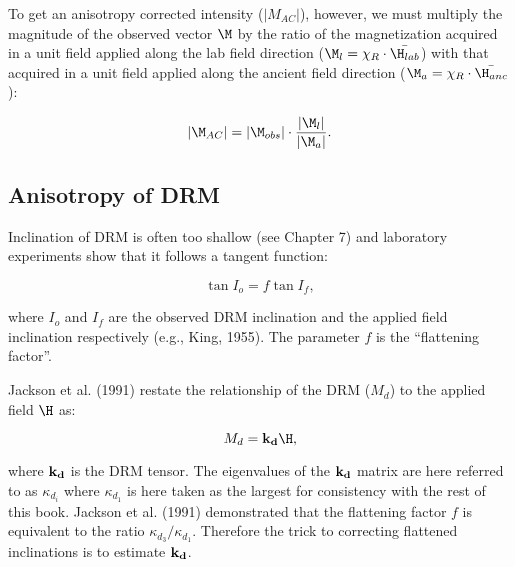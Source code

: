 \noindent To get an anisotropy corrected intensity ($|M_{AC}|$), however, we must multiply the magnitude of the observed vector $\M$ by the ratio of the magnetization acquired in a unit field applied along the lab field direction  ($\M_l = \chi_R \cdot \bar { \H_{lab}}$)  with that acquired in a unit field applied along the ancient field direction ($\M_a=\chi_R \cdot \bar {\H_{anc}}$):

$$
|\M_{AC}| =  |\M_{obs}| \cdot {  {|\M_l|} \over {|\M_a|} }.
$$
 
 \subsection{Anisotropy of DRM}
 
Inclination of DRM is often too shallow (see Chapter 7) and  laboratory experiments show that it follows a tangent function:
 
\begin{equation}
\tan I_o = f\tan I_f,
\label{eq:flattening}
\end{equation}

\noindent
 where $I_o$ and $I_f$ are the observed DRM inclination and  the applied field inclination respectively (e.g., 
 King, 1955).  \nocite{king55} The parameter $f$ is the ``flattening factor''.   
 
     Jackson et al. (1991)  \nocite{jackson91}
     restate the relationship of the DRM ($M_d$)  to the applied field $\H$ as:
 
$$
M_d =  {\bf k_d}  \H,
$$
 
 \noindent where ${\bf k_d}$ is the DRM tensor.  The eigenvalues of the ${\bf k_d}$ matrix are here referred to as $\kappa_{d_i}$ where $\kappa_{d_1}$ is here taken as the largest for consistency with the rest of this book.    
  Jackson et al. (1991)  demonstrated that the flattening factor $f$ is equivalent to  the ratio $\kappa_{d_3}/\kappa_{d_1}$.  Therefore the trick to correcting flattened inclinations is to estimate ${\bf k_d}$.   
 
